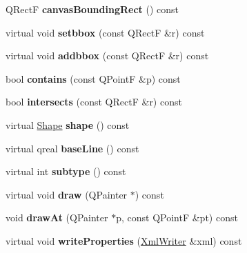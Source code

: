 \begin{DoxyCompactItemize}
Q\+RectF {\bfseries canvas\+Bounding\+Rect} () const
\item 
\mbox{\label{class_ms_1_1_element_abe5c0aa8e74388b2b6b336dfec469a35}} 
virtual void {\bfseries setbbox} (const Q\+RectF \&r) const
\item 
\mbox{\label{class_ms_1_1_element_aeda671935e53857c2dee17b03d68b276}} 
virtual void {\bfseries addbbox} (const Q\+RectF \&r) const
\item 
\mbox{\label{class_ms_1_1_element_a50e66c130bd475554fef1131c68ee4bb}} 
bool {\bfseries contains} (const Q\+PointF \&p) const
\item 
\mbox{\label{class_ms_1_1_element_a77459c7e2f1077ec3b68b11c26640685}} 
bool {\bfseries intersects} (const Q\+RectF \&r) const
\item 
\mbox{\label{class_ms_1_1_element_ad46a1fa8985b3d3897101b295a7a5d3e}} 
virtual \hyperlink{class_ms_1_1_shape}{Shape} {\bfseries shape} () const
\item 
\mbox{\label{class_ms_1_1_element_a977f5fd6785ea8b160d6b1943727ec9e}} 
virtual qreal {\bfseries base\+Line} () const
\item 
\mbox{\label{class_ms_1_1_element_ad38a889b51fa8b8553a15ca29abbc874}} 
virtual int {\bfseries subtype} () const
\item 
\mbox{\label{class_ms_1_1_element_a0e093baaf71efa68b681c69e70a2cb71}} 
virtual void {\bfseries draw} (Q\+Painter $\ast$) const
\item 
\mbox{\label{class_ms_1_1_element_aea1fcde23f210754997babe67e7c32aa}} 
void {\bfseries draw\+At} (Q\+Painter $\ast$p, const Q\+PointF \&pt) const
\item 
\mbox{\label{class_ms_1_1_element_a6d2d848ec99034b85e1a4e3b33857840}} 
virtual void {\bfseries write\+Properties} (\hyperlink{class_ms_1_1_xml_writer}{Xml\+Writer} \&xml) const
\item 
\mbox{\label{class_ms_1_1_element_aabedff22ee4d865dea6442fabb6a53a2}} 

\end{DoxyCompactItemize}

